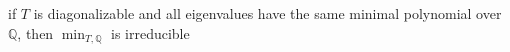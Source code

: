 \documentclass[preview]{standalone}
\begin{document}
\begin{center}
if $T$ is diagonalizable and all eigenvalues have the same minimal polynomial over $\mathbb{Q}$, then $\min_{T, \mathbb{Q}}$ is irreducible
\end{center}
\end{document}
